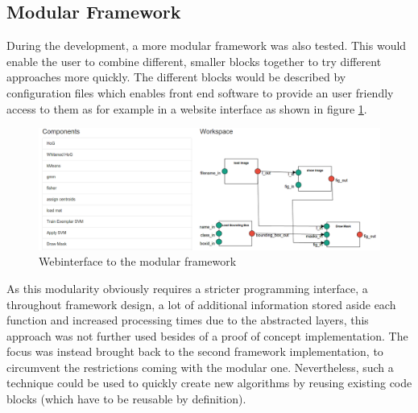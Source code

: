 \subsection{Modular Framework}

During the development, a more modular framework was also tested. This would enable the user to combine different, smaller blocks together to try different approaches more quickly. The different blocks would be described by configuration files which enables front end software to provide an user friendly access to them as for example in a website interface as shown in figure \ref{fig:modular_webpage}.

\begin{figure}
\centering
\includegraphics[width=\textwidth]{images/modular_webpage}
\caption{Webinterface to the modular framework}
\label{fig:modular_webpage}
\end{figure}

As this modularity obviously requires a stricter programming interface, a throughout framework design, a lot of additional information stored aside each function and increased processing times due to the abstracted layers, this approach was not further used besides of a proof of concept implementation. The focus was instead brought back to the second framework implementation, to circumvent the restrictions coming with the modular one. Nevertheless, such a technique could be used to quickly create new algorithms by reusing existing code blocks (which have to be reusable by definition).